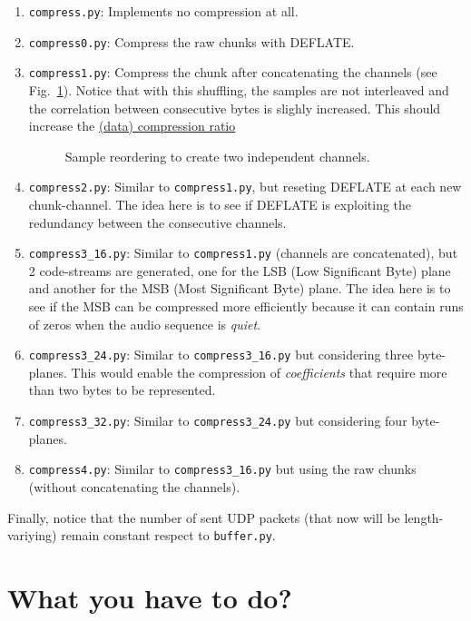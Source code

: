 \begin{enumerate}
\item \verb|compress.py|: Implements no compression at all.
\item \verb|compress0.py|: Compress the raw chunks with DEFLATE.
\item \verb|compress1.py|: Compress the chunk after concatenating the
  channels (see Fig.~\ref{fig:reordering}). Notice that with this
  shuffling, the samples are not interleaved and the correlation
  between consecutive bytes is slighly increased. This should increase
  the
  \href{https://en.wikipedia.org/wiki/Data_compression_ratio}{(data)
    compression ratio}
\begin{figure}
  \begin{center}
  \end{center}
  \caption{Sample reordering to create two independent channels.}
  \label{fig:reordering}
\end{figure}
\item \verb|compress2.py|: Similar to \verb|compress1.py|, but
  reseting DEFLATE at each new chunk-channel. The idea here is to see
  if DEFLATE is exploiting the redundancy between the consecutive
  channels.
\item \verb|compress3_16.py|: Similar to \verb|compress1.py| (channels
  are concatenated), but 2 code-streams are generated, one for the LSB
  (Low Significant Byte) plane and another for the MSB (Most
  Significant Byte) plane. The idea here is to see if the MSB can be
  compressed more efficiently because it can contain runs of zeros
  when the audio sequence is \emph{quiet}.
\item \verb|compress3_24.py|: Similar to \verb|compress3_16.py| but
  considering three byte-planes. This would enable the compression of
  \emph{coefficients} that require more than two bytes to be
  represented.
\item \verb|compress3_32.py|: Similar to \verb|compress3_24.py| but
  considering four byte-planes.
\item \verb|compress4.py|: Similar to \verb|compress3_16.py| but using
  the raw chunks (without concatenating the channels).
\end{enumerate}

Finally, notice that the number of sent UDP packets (that now will be
length-variying) remain constant respect to \verb|buffer.py|.

\section{What you have to do?}

